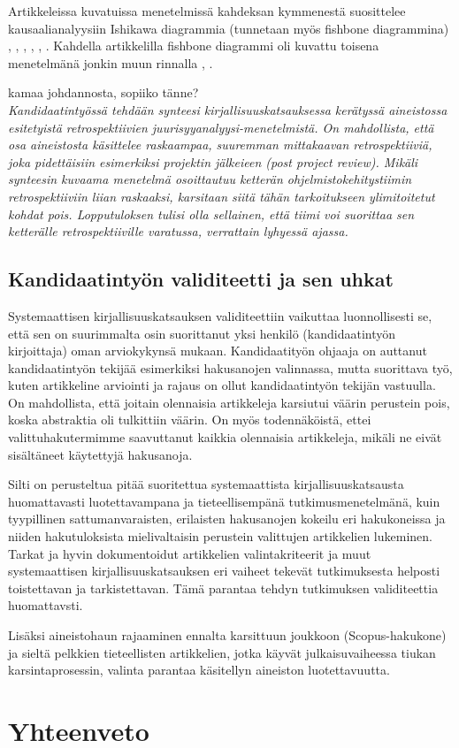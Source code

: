 Artikkeleissa kuvatuissa menetelmissä kahdeksan kymmenestä suosittelee kausaalianalyysiin Ishikawa diagrammia (tunnetaan myös fishbone diagrammina) \citep{kalinowski2012evidence}, \citep{de2004learning}, \citep{staalhane2004root}, \citep{dingsoyr2003extending}, \citep{birk2002postmortem}, \citep{card1998learning}. Kahdella artikkelilla fishbone diagrammi oli kuvattu toisena menetelmänä jonkin muun rinnalla \citep{Bjornson2009}, \citep{staalhane2003post}.


kamaa johdannosta, sopiiko tänne?\\
\textit{Kandidaatintyössä tehdään synteesi kirjallisuuskatsauksessa kerätyssä aineistossa esitetyistä retrospektiivien juurisyyanalyysi-menetelmistä. On mahdollista, että osa aineistosta käsittelee raskaampaa, suuremman mittakaavan retrospektiiviä, joka pidettäisiin esimerkiksi projektin jälkeieen (post project review). Mikäli synteesin kuvaama menetelmä osoittautuu ketterän ohjelmistokehitystiimin retrospektiiviin liian raskaaksi, karsitaan siitä tähän tarkoitukseen ylimitoitetut kohdat pois. Lopputuloksen tulisi olla sellainen, että tiimi voi suorittaa sen ketterälle retrospektiiville varatussa, verrattain lyhyessä ajassa.}



\subsection{Kandidaatintyön validiteetti ja sen uhkat}
Systemaattisen kirjallisuuskatsauksen validiteettiin vaikuttaa luonnollisesti se, että sen on suurimmalta osin suorittanut yksi henkilö (kandidaatintyön kirjoittaja) oman arviokykynsä mukaan. Kandidaatityön ohjaaja on auttanut kandidaatintyön tekijää esimerkiksi hakusanojen valinnassa, mutta suorittava työ, kuten artikkeline arviointi ja rajaus on ollut kandidaatintyön tekijän vastuulla. On mahdollista, että joitain olennaisia artikkeleja karsiutui väärin perustein pois, koska abstraktia oli tulkittiin väärin. On myös todennäköistä, ettei valittuhakutermimme saavuttanut kaikkia olennaisia artikkeleja, mikäli ne eivät sisältäneet käytettyjä hakusanoja.

Silti on perusteltua pitää suoritettua systemaattista kirjallisuuskatsausta huomattavasti luotettavampana ja tieteellisempänä tutkimusmenetelmänä, kuin tyypillinen sattumanvaraisten, erilaisten hakusanojen kokeilu eri hakukoneissa ja niiden hakutuloksista mielivaltaisin perustein valittujen artikkelien lukeminen. Tarkat ja hyvin dokumentoidut artikkelien valintakriteerit ja muut systemaattisen kirjallisuuskatsauksen eri vaiheet tekevät tutkimuksesta helposti toistettavan ja tarkistettavan. Tämä parantaa tehdyn tutkimuksen validiteettia huomattavsti.

Lisäksi aineistohaun rajaaminen ennalta karsittuun joukkoon (Scopus-hakukone) ja sieltä pelkkien tieteellisten artikkelien, jotka käyvät julkaisuvaiheessa tiukan karsintaprosessin, valinta parantaa käsitellyn aineiston luotettavuutta.

\section{Yhteenveto}
